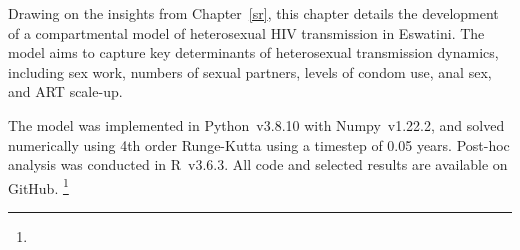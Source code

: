 Drawing on the insights from Chapter~\ref{sr},
this chapter details the development of
a compartmental model of heterosexual HIV transmission in Eswatini.
The model aims to capture key determinants of heterosexual transmission dynamics, including
sex work, numbers of sexual partners, levels of condom use, anal sex, and ART scale-up.
\par
The model was implemented in Python~v3.8.10 with Numpy~v1.22.2,
and solved numerically using 4th order Runge-Kutta \cite{Gill1951} using a timestep of 0.05 years.
Post-hoc analysis was conducted in R~v3.6.3.
All code and selected results are available on GitHub.%
\footnote{}